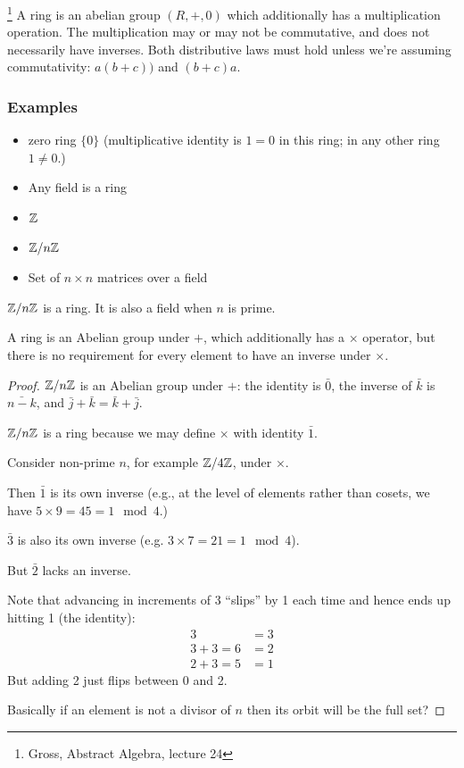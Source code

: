 \begin{definition*}[Ring]\footnote{Gross, Abstract Algebra, lecture 24}
A ring is an abelian group $(R, +, 0)$ which additionally has a multiplication
operation. The multiplication may or may not be commutative, and does not
necessarily have inverses. Both distributive laws must hold unless we're
assuming commutativity: $a(b + c))$ and $(b + c)a$.
\end{definition*}

\subsubsection{Examples}
\begin{itemize}
\item zero ring $\{0\}$ (multiplicative identity is $1 = 0$ in this ring; in
  any other ring $1 \neq 0$.)
\item Any field is a ring
\item $\mathbb{Z}$
\item $\mathbb{Z}/n\mathbb{Z}$
\item Set of $n \times n$ matrices over a field
\end{itemize}

\begin{claim}
  $\mathbb{Z}/n\mathbb{Z}$ is a ring. It is also a field when $n$ is prime.
\end{claim}

\begin{definition}
  A ring is an Abelian group under $+$, which additionally has a $\times$ operator, but there is no requirement
  for every element to have an inverse under $\times$.
\end{definition}

\begin{proof}
  $\mathbb{Z}/n\mathbb{Z}$ is an Abelian group under $+$: the identity is $\bar 0$, the inverse of $\bar k$ is $\bar{n - k}$, and $\bar j + \bar k = \bar k +\bar j$.

  $\mathbb{Z}/n\mathbb{Z}$ is a ring because we may define $\times$ with identity $\bar 1$.

  Consider non-prime $n$, for example $\mathbb{Z}/4\mathbb{Z}$, under $\times$.

  Then $\bar 1$ is its own inverse (e.g., at the level of elements rather than cosets, we
  have $5 \times 9 = 45 = 1 \mod 4$.)

  $\bar 3$ is also its own inverse (e.g. $3 \times 7 = 21 = 1 \mod 4$).

  But $\bar 2$ lacks an inverse.

  Note that advancing in increments of 3 ``slips​'' by 1 each time and hence ends up hitting 1 (the identity):
  \begin{align*}
    3             &= 3 \\
    3 + 3     = 6 &= 2 \\
    2 + 3     = 5 &= 1
  \end{align*}
  But adding 2 just flips between 0 and 2.

  Basically if an element is not a divisor of $n$ then its orbit will be the full set?
\end{proof}


